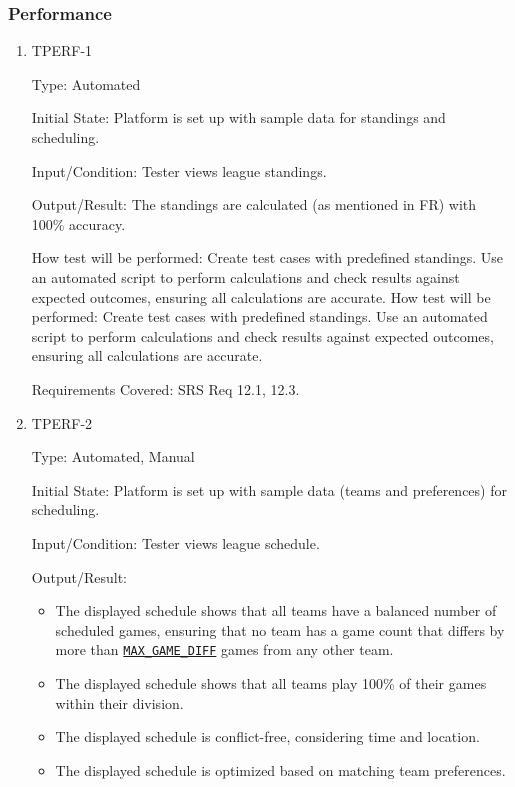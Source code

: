 \documentclass[12pt, titlepage]{article}
\begin{document}
\subsubsection{Performance}

\begin{enumerate}

  \item{TPERF-1\\}

        Type: Automated

        Initial State: Platform is set up with sample data for standings and scheduling.

        Input/Condition: Tester views league standings.

        Output/Result: The standings are calculated (as mentioned in FR) with 100\% accuracy.

        How test will be performed: Create test cases with predefined standings. Use an automated script to perform calculations and check results against expected outcomes, ensuring all calculations are accurate.
How test will be performed: Create test cases with predefined standings. Use an automated script to perform calculations and check results against expected outcomes, ensuring all calculations are accurate.

Requirements Covered: SRS Req 12.1, 12.3.

\item{TPERF-2\\}

        Type: Automated, Manual

        Initial State: Platform is set up with sample data (teams and preferences) for scheduling.

        Input/Condition: Tester views league schedule.

        Output/Result:
        \begin{itemize}
          \item{The displayed schedule shows that all teams have a balanced number of scheduled games, ensuring that no team has a game count that differs by more than \hyperref[MAX_GAME_DIFF]{\texttt{MAX\_GAME\_DIFF}} games from any other team.}
          \item{The displayed schedule shows that all teams play 100\% of their games within their division.}
          \item{The displayed schedule is conflict-free, considering time and location.}
          \item{The displayed schedule is optimized based on matching team preferences.}
        \end{itemize}


\end{enumerate}
\end{document}
